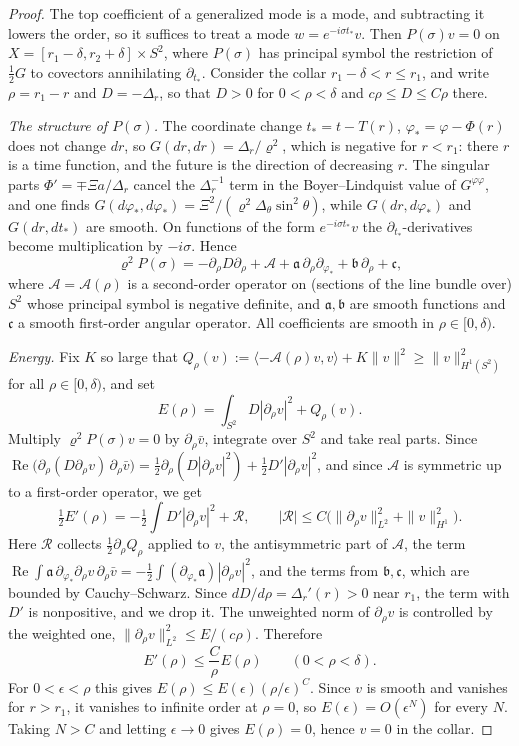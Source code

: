 \documentclass[11pt]{amsart}
\theoremstyle{definition}
\theoremstyle{remark}
\numberwithin{equation}{section}
\renewcommand{\Re}{\operatorname{Re}}
\begin{document}
\begin{proof}
The top coefficient of a generalized mode is a mode, and subtracting it lowers the order, so it suffices to treat a
mode $w=e^{-i\sigma t_*}v$. Then $P(\sigma)v=0$ on $X=[r_1-\delta,r_2+\delta]\times S^2$, where $P(\sigma)$ has principal
symbol the restriction of $\frac12G$ to covectors annihilating $\partial_{t_*}$. Consider the collar $r_1-\delta<r\le r_1$, and write $\rho=r_1-r$ and $D=-\Delta_r$, so that $D>0$ for
$0<\rho<\delta$ and $c\rho\le D\le C\rho$ there.

\emph{The structure of $P(\sigma)$.} The coordinate change $t_*=t-T(r)$, $\varphi_*=\varphi-\Phi(r)$ does not change $dr$, so
$G(dr,dr)=\Delta_r/\varrho^2$, which is negative for $r<r_1$: there $r$ is a time function, and the future is the
direction of decreasing $r$. The singular parts $\Phi'=\mp\Xi a/\Delta_r$ cancel the $\Delta_r^{-1}$ term in the
Boyer--Lindquist value of $G^{\varphi\varphi}$, and one finds $G(d\varphi_*,d\varphi_*)=\Xi^2/(\varrho^2\Delta_\theta\sin^2\theta)$,
while $G(dr,d\varphi_*)$ and $G(dr,dt_*)$ are smooth. On functions of the form $e^{-i\sigma t_*}v$ the $\partial_{t_*}$-derivatives
become multiplication by $-i\sigma$. Hence
\[
\varrho^2P(\sigma)=-\partial_\rho D\partial_\rho+\mathcal A+\mathfrak a\,\partial_\rho\partial_{\varphi_*}+\mathfrak b\,\partial_\rho+\mathfrak c,
\]
where $\mathcal A=\mathcal A(\rho)$ is a second-order operator on (sections of the line bundle over) $S^2$ whose principal
symbol is negative definite, and $\mathfrak a,\mathfrak b$ are smooth functions and $\mathfrak c$ a smooth first-order
angular operator. All coefficients are smooth in $\rho\in[0,\delta)$.

\emph{Energy.} Fix $K$ so large that $Q_\rho(v):=\langle-\mathcal A(\rho)v,v\rangle+K\|v\|^2\ge\|v\|_{H^1(S^2)}^2$ for all
$\rho\in[0,\delta)$, and set
\[
E(\rho)=\int_{S^2}D|\partial_\rho v|^2+Q_\rho(v) .
\]
Multiply $\varrho^2P(\sigma)v=0$ by $\partial_\rho\bar v$, integrate over $S^2$ and take real parts. Since
$\Re\big(\partial_\rho(D\partial_\rho v)\,\partial_\rho\bar v\big)=\frac12\partial_\rho(D|\partial_\rho v|^2)+\frac12D'|\partial_\rho v|^2$, and since
$\mathcal A$ is symmetric up to a first-order operator, we get
\[
\tfrac12E'(\rho)=-\tfrac12\int D'|\partial_\rho v|^2+\mathcal R,\qquad
|\mathcal R|\le C\big(\|\partial_\rho v\|_{L^2}^2+\|v\|_{H^1}^2\big).
\]
Here $\mathcal R$ collects $\frac12\partial_\rho Q_\rho$ applied to $v$, the antisymmetric part of $\mathcal A$, the term
$\Re\int\mathfrak a\,\partial_{\varphi_*}\partial_\rho v\,\partial_\rho\bar v=-\frac12\int(\partial_{\varphi_*}\mathfrak a)|\partial_\rho v|^2$, and the
terms from $\mathfrak b,\mathfrak c$, which are bounded by Cauchy--Schwarz. Since $dD/d\rho=\Delta_r'(r)>0$ near $r_1$, the term with $D'$ is
nonpositive, and we drop it. The unweighted norm of $\partial_\rho v$ is controlled by the weighted one,
$\|\partial_\rho v\|_{L^2}^2\le E/(c\rho)$. Therefore
\[
E'(\rho)\le\frac{C}{\rho}E(\rho)\qquad(0<\rho<\delta).
\]
For $0<\epsilon<\rho$ this gives $E(\rho)\le E(\epsilon)(\rho/\epsilon)^{C}$. Since $v$ is smooth and vanishes for
$r>r_1$, it vanishes to infinite order at $\rho=0$, so $E(\epsilon)=O(\epsilon^N)$ for every $N$. Taking $N>C$ and letting
$\epsilon\to0$ gives $E(\rho)=0$, hence $v=0$ in the collar.


\end{proof}
\end{document}
